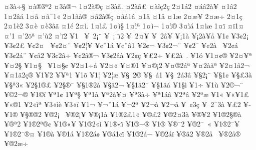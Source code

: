 {^^a43^^e0^^f7^^a7
^^a4^^e0^^ae3^^aa2
^^a43^^e0^^ae^^ac^^ad
1^^a42^^e0^^ae^^e7
^^a43^^e0^^e3.
^^a42^^e0^^e3^^a3
^^a4^^e0^^ee^^e72^^e7
2^^a41^^e12
^^a4^^e1^^e22^^e0^^a5
^^a41^^e22
1^^a42^^e2^^e1
1^^a4^^e3
^^a4^^e3^^af1^^ab
2^^a41^^e3^^e0^^ae
^^a4^^e32^^e0^^ae^^e7
^^a4^^e3^^e11^^e2
^^a41^^e4
^^a41^^e5
^^a41^^e6
2^^a4^^e6^^a5
2^^a4^^e6^^f7
2^^a41^^e7
2^^a41^^e82
3^^a4^^e8^^ad
^^a4^^e83^^e2^^e3
^^a41^^e9
2^^a4^^ec.
1^^a4^^ec^^a3
1^^a4^^ec^^a7
1^^a4^^ec^^aa
1^^a4^^ec^^ac
1^^a4^^ec^^ae
3^^a4^^ec^^e1
1^^a4^^ec^^e6
1^^a4^^ef
^^a4^^ef1^^a4
^^a4'1
^^a4'2^^f5^^aa
^^a4'^^f92
^^a4'^^ef2
^^a51^^a0
^^a5^^a02^^a1^^a8
^^a5^^a0^^a1^^a8^^ef2
^^a5^^a02^^a4^^a5
^^a5^^a02^^e2^^a5
^^a5^^a11^^e0
^^a5^^a12^^e0^^a5^^e5
^^a51^^a2
^^a53^^a22^^a1
^^a53^^a22^^a3
^^a5^^a22^^a4^^a0
^^a5^^a22^^a4^^a8
^^a5^^a22^^a6^^a5
^^a5^^a2^^a81^^e1
^^a5^^a2^^a8^^e21
^^a52^^a2^^ac
^^a53^^a22^^ac^^a8
^^a5^^a22^^af
^^a5^^a22^^e0^^a0
^^a52^^a2^^e1
^^a53^^a22^^e1^^a8
^^a5^^a2^^e22
^^a53^^a22^^e2^^f7
^^a5^^a22^^e2^^ae^^ac
^^a53^^a22^^e2^^e0
^^a52^^a2^^e7
^^a5^^a32^^ad^^f7
^^a5^^a32^^e0^^a0.
^^a51^^f3
^^a51^^a4^^a2^^ae
^^a52^^a4^^a5^^aa
^^a5^^a42^^a7
^^a51^^a4^^a7^^a0
^^a51^^a4^^a7^^a2
^^a52^^a41^^f7^^e1
^^a52^^a4^^ab
^^a5^^a4^^ae1
^^a5^^a4^^ae^^a12
^^a5^^a4^^ae2^^e1^^aa
^^a5^^a42^^e0^^e3^^aa
^^a52^^a41^^e32^^ac
^^a5^^a41^^e32^^e7^^ae
^^a51^^a52
^^a5^^a5^^aa1
^^a51^^f5
^^a51^^a6
^^a52^^a6^^e6
^^a5^^a7^^a02^^a9
^^a5^^a7^^a0^^e11
^^a5^^a7^^a02^^e13^^e2
^^a5^^a72^^a1^^a8
^^a5^^a71^^a2
^^a5^^a7^^a33^^e0^^a0
^^a5^^a7^^aa3^^ab
^^a52^^a71^^ae^^a3
^^a52^^a7^^ae^^af
^^a5^^a71^^ae2^^e0
^^a5^^a7^^e32^^ac
^^a5^^a71^^e32^^af
^^a5^^a71^^e3^^e1
^^a51^^a7^^ec
^^a51^^f7
^^a51^^f9
^^a52^^a9^^ac^^a8
^^a5^^a92^^ac^^ae
^^a51^^a9^^ad^^ef
^^a5^^aa1^^a2
1^^a5^^aa^^a7
^^a5^^aa1^^e0
^^a5^^aa2^^e0^^a5^^a4
^^a5^^aa3^^e0^^f7
^^a5^^aa1^^e1^^e2
^^a52^^aa^^e2
^^a52^^aa^^e6
^^a51^^ab
^^a5^^ab^^a51^^a3
^^a5^^ab^^ae1
^^a52^^ab^^ec^^aa
^^a53^^ab^^ec^^e8
^^a53^^ab^^ef
^^a51^^ac
^^a5^^ac^^a81^^e1
^^a5^^ac2^^aa^^ad
^^a52^^ac^^e0
^^a52^^ac^^e5
^^a5^^ad^^a0^^a23^^e7
^^a5^^ad^^a02^^af3^^e0
^^a5^^ad^^a32
^^a5^^ad^^a51^^ae
^^a5^^ad^^a7^^ae^^ae2
^^a5^^ae2^^a1^^a0
^^a5^^ae2^^a1^^a5
^^a5^^ae^^a11^^e0
^^a51^^ae2^^a31^^ab
^^a5^^ae^^a32^^ad
^^a5^^ae2^^a43^^e0
^^a5^^ae^^a52
^^a51^^ae2^^a7^^ae^^e0
^^a5^^ae^^aa2
^^a51^^ae2^^aa^^ae^^a2
^^a51^^ae^^ab^^a5
^^a51^^ae2^^ab^^ec
^^a51^^ae^^ab^^ef
^^a51^^ae^^ac^^ae
^^a51^^ae^^ad
^^a5^^ae^^af2
^^a5^^ae2^^af^^a0^^ab
^^a51^^ae2^^af^^a5
^^a51^^ae2^^af^^ae^^a4
^^a51^^ae^^e0
^^a5^^ae1^^e1
^^a51^^ae2^^e1^^a2
^^a5^^ae^^e11^^a2^^ef
^^a51^^ae2^^e1^^ac
^^a5^^ae2^^e1^^ef
^^a5^^ae^^e22
^^a5^^ae2^^e5^^a0
^^a5^^ae2^^e5^^ae
^^a5^^ae2^^e6^^f7
}
